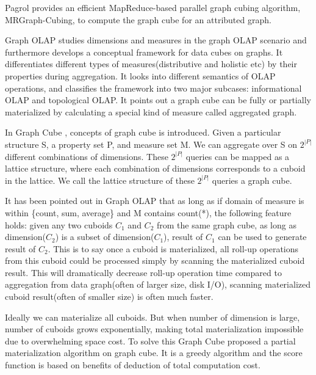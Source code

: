 Pagrol \cite{DBLP:conf/icde/WangFWTAA14} provides an efficient MapReduce-based parallel graph cubing algorithm, MRGraph-Cubing, to compute the graph cube for an attributed graph.


Graph OLAP \cite{DBLP:conf/icdm/ChenYZHY08} studies dimensions and measures in the graph OLAP scenario and furthermore develops a conceptual framework for data cubes on graphs. It differentiates different types of measures(distributive and holistic etc) by their properties during aggregation. It looks into different semantics of OLAP operations, and classifies the framework into two major subcases: informational OLAP and topological OLAP. It points out a graph cube can be fully or partially materialized by calculating a special kind of measure called aggregated graph.

In Graph Cube \cite{DBLP:conf/sigmod/ZhaoLXH11}, concepts of graph cube is introduced. Given a particular structure S, a property set P, and measure set M. We can aggregate over S on $2^{|P|}$ different combinations of dimensions. These $2^{|P|}$ queries can be mapped as a lattice structure, where each combination of dimensions corresponds to a cuboid in the lattice. We call the lattice structure of these $2^{|P|}$ queries a graph cube.


It has been pointed out in  Graph OLAP \cite{DBLP:conf/icdm/ChenYZHY08} that as long as if domain of measure is within \{count, sum, average\} and M contains count(*), the following feature holds: given any two cuboids $C_1$ and $C_2$ from the same graph cube, as long as dimension($C_2$) is a subset of dimension($C_1$), result of $C_1$ can be used to generate result of $C_2$. This is to say once a cuboid is materialized, all roll-up operations from this cuboid could be processed simply by scanning the materialized cuboid result. This will dramatically decrease roll-up operation time compared to aggregation from data graph(often of larger size, disk I/O), scanning materialized cuboid result(often of smaller size) is often much faster.


Ideally we can materialize all cuboids. But when number of dimension is large, number of cuboids grows exponentially, making total materialization impossible due to overwhelming space cost. To solve this Graph Cube \cite{DBLP:conf/sigmod/ZhaoLXH11} proposed a partial materialization algorithm on graph cube. It is a greedy algorithm and the score function is based on benefits of deduction of total computation cost.

